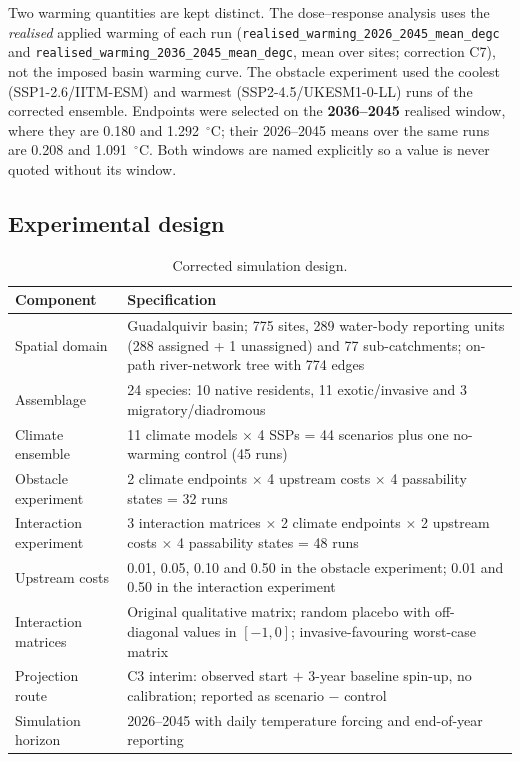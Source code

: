 \documentclass[11pt,a4paper]{article}
\begin{document}
Two warming quantities are kept distinct. The dose--response analysis uses the \emph{realised} applied warming of each run (\texttt{realised\_warming\_2026\_2045\_mean\_degc} and \texttt{realised\_warming\_2036\_2045\_mean\_degc}, mean over sites; correction C7), not the imposed basin warming curve. The obstacle experiment used the coolest (SSP1-2.6/IITM-ESM) and warmest (SSP2-4.5/UKESM1-0-LL) runs of the corrected ensemble. Endpoints were selected on the \textbf{2036--2045} realised window, where they are 0.180 and 1.292~$^\circ$C; their 2026--2045 means over the same runs are 0.208 and 1.091~$^\circ$C. Both windows are named explicitly so a value is never quoted without its window.

\subsection{Experimental design}

\begin{table}[H]
\centering
\caption{Corrected simulation design.}
\small
\begin{tabularx}{\textwidth}{>{\raggedright\arraybackslash}p{}Y}
\toprule
Component & Specification \\
\midrule
Spatial domain & Guadalquivir basin; 775 sites, 289 water-body reporting units (288 assigned + 1 unassigned) and 77 sub-catchments; on-path river-network tree with 774 edges \\
Assemblage & 24 species: 10 native residents, 11 exotic/invasive and 3 migratory/diadromous \\
Climate ensemble & 11 climate models $\times$ 4 SSPs = 44 scenarios plus one no-warming control (45 runs) \\
Obstacle experiment & 2 climate endpoints $\times$ 4 upstream costs $\times$ 4 passability states = 32 runs \\
Interaction experiment & 3 interaction matrices $\times$ 2 climate endpoints $\times$ 2 upstream costs $\times$ 4 passability states = 48 runs \\
Upstream costs & 0.01, 0.05, 0.10 and 0.50 in the obstacle experiment; 0.01 and 0.50 in the interaction experiment \\
Interaction matrices & Original qualitative matrix; random placebo with off-diagonal values in $[-1,0]$; invasive-favouring worst-case matrix \\
Projection route & C3 interim: observed start $+$ 3-year baseline spin-up, no calibration; reported as scenario $-$ control \\
Simulation horizon & 2026--2045 with daily temperature forcing and end-of-year reporting \\
\bottomrule
\end{tabularx}
\end{table}
\end{document}
